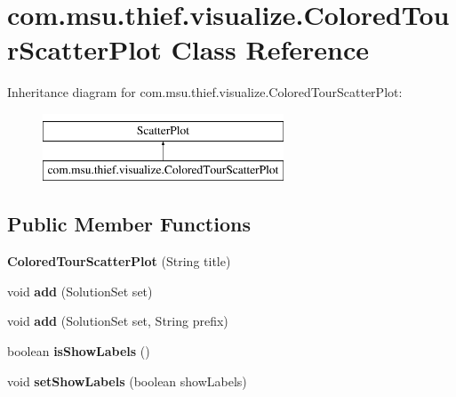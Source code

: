 \hypertarget{classcom_1_1msu_1_1thief_1_1visualize_1_1ColoredTourScatterPlot}{\section{com.\-msu.\-thief.\-visualize.\-Colored\-Tour\-Scatter\-Plot Class Reference}
\label{classcom_1_1msu_1_1thief_1_1visualize_1_1ColoredTourScatterPlot}
}
Inheritance diagram for com.\-msu.\-thief.\-visualize.\-Colored\-Tour\-Scatter\-Plot\-:\begin{figure}[H]
\begin{center}
\leavevmode
\includegraphics[height=2.000000cm]{classcom_1_1msu_1_1thief_1_1visualize_1_1ColoredTourScatterPlot}
\end{center}
\end{figure}
\subsection*{Public Member Functions}
\begin{DoxyCompactItemize}
\item 
\hypertarget{classcom_1_1msu_1_1thief_1_1visualize_1_1ColoredTourScatterPlot_a96e5d16e37eb0c860226bd69c777c712}{{\bfseries Colored\-Tour\-Scatter\-Plot} (String title)}\label{classcom_1_1msu_1_1thief_1_1visualize_1_1ColoredTourScatterPlot_a96e5d16e37eb0c860226bd69c777c712}

\item 
\hypertarget{classcom_1_1msu_1_1thief_1_1visualize_1_1ColoredTourScatterPlot_ae32ec9970c2ac9302f039a611dc6a878}{void {\bfseries add} (Solution\-Set set)}\label{classcom_1_1msu_1_1thief_1_1visualize_1_1ColoredTourScatterPlot_ae32ec9970c2ac9302f039a611dc6a878}

\item 
\hypertarget{classcom_1_1msu_1_1thief_1_1visualize_1_1ColoredTourScatterPlot_ae64b34b087ca7941cbb377da02f80fd3}{void {\bfseries add} (Solution\-Set set, String prefix)}\label{classcom_1_1msu_1_1thief_1_1visualize_1_1ColoredTourScatterPlot_ae64b34b087ca7941cbb377da02f80fd3}

\item 
\hypertarget{classcom_1_1msu_1_1thief_1_1visualize_1_1ColoredTourScatterPlot_a21e0aef1285bc91ed1f406b5c3394f75}{boolean {\bfseries is\-Show\-Labels} ()}\label{classcom_1_1msu_1_1thief_1_1visualize_1_1ColoredTourScatterPlot_a21e0aef1285bc91ed1f406b5c3394f75}

\item 
\hypertarget{classcom_1_1msu_1_1thief_1_1visualize_1_1ColoredTourScatterPlot_a6ce3e91bac3eecfb3605ad308ae5e9ee}{void {\bfseries set\-Show\-Labels} (boolean show\-Labels)}\label{classcom_1_1msu_1_1thief_1_1visualize_1_1ColoredTourScatterPlot_a6ce3e91bac3eecfb3605ad308ae5e9ee}

\end{DoxyCompactItemize}
